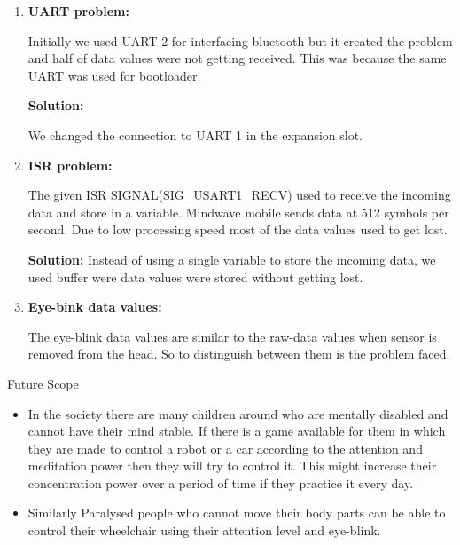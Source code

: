\documentclass[14pt]{article}
\begin{document}
\begin{enumerate}
	\item \textbf{UART problem:}

Initially we used UART 2 for interfacing bluetooth but it created the problem and half of data values were not getting received. This was because the same UART was used for bootloader.

\textbf{Solution:}

We changed the connection to UART 1 in the expansion slot.

\item \textbf{ISR problem:}


The given ISR SIGNAL(SIG\_USART1\_RECV) used to receive the incoming data and store in a variable. Mindwave mobile sends data at 512 symbols per second. Due to low processing speed most of the data values used to get lost.

\textbf{Solution:}
Instead of using a single variable to store the incoming data, we used buffer were data values were stored without getting lost.

	\item \textbf{Eye-bink data values:}


The eye-blink data values are similar to the raw-data values when sensor is removed from the head. So to distinguish between them is the problem faced.
\end{enumerate}

\break

\begin{center}
{\Huge Future Scope}
\end{center}

\begin{itemize}
	\item In the society there are many children around who are mentally disabled and cannot have their mind stable. If there is a game available for them in which they are made to control a robot or a car according to the attention and meditation power then they will try to control it. This might increase their concentration power over a period of time if they practice it every day.
\end{itemize}

\begin{itemize}
	\item Similarly Paralysed people who cannot move their body parts can be able to control their wheelchair using their attention level and eye-blink.
\end{itemize}
\end{document}
